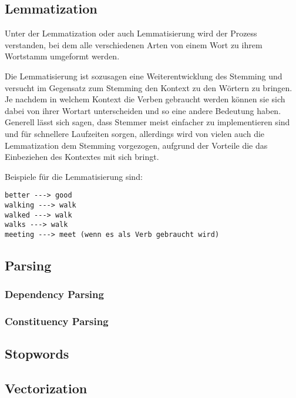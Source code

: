 \subsection{Lemmatization}

Unter der Lemmatization oder auch Lemmatisierung wird der Prozess verstanden, bei dem alle verschiedenen Arten von einem Wort zu ihrem Wortstamm umgeformt werden.

Die Lemmatisierung ist sozusagen eine Weiterentwicklung des Stemming und versucht im Gegensatz zum Stemming den Kontext zu den Wörtern zu bringen.
Je nachdem in welchem Kontext die Verben gebraucht werden können sie sich dabei von ihrer Wortart unterscheiden und so eine andere Bedeutung haben.
Generell lässt sich sagen, dass Stemmer meist einfacher zu implementieren sind und für schnellere Laufzeiten sorgen, allerdings wird von vielen auch die Lemmatization dem Stemming vorgezogen, aufgrund der Vorteile die das Einbeziehen des Kontextes mit sich bringt.\cite{machineLearningTextAnalysis, textAnalysisMonkeylearn, stemmingLemmatization, }


Beispiele für die Lemmatisierung sind:

\begin{lstlisting}[label={lst: Lemmatization}]
better ---> good
walking ---> walk
walked ---> walk
walks ---> walk
meeting ---> meet (wenn es als Verb gebraucht wird)
\end{lstlisting}

\subsection{Parsing}


\subsubsection{Dependency Parsing}


\subsubsection{Constituency Parsing}


\subsection{Stopwords}


\subsection{Vectorization}


